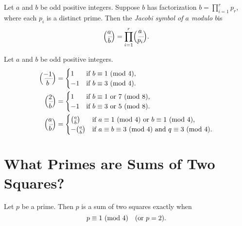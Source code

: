 \documentclass[10pt]{article}
\begin{document}
\begin{definition*}[\textcolor{red}{Jacobi Symbol of $a$ modulo $b$}]
    Let $a$ and $b$ be odd positive integers. Suppose $b$ has factorization $b=\prod_{i=1}^r p_r$, where each $p_i$ is a distinct prime. Then the \textit{Jacobi symbol of $a$ modulo $b$}is
    \[\legendre{a}{b}=\prod_{i=1}^r \legendre{a}{p_i}.\]
\end{definition*}


\begin{theorem}[\textcolor{red}{Generalized Law of Quadratic Reciprocity}]
Let $a$ and $b$ be odd positive integers.
    \begin{align*}
        \legendre{-1}{b}&= 
        \begin{cases}
            1 & \textnormal{if $b\equiv 1 \mod{4}$,} \\
            -1 & \textnormal{if $b \equiv 3 \mod{4}$.}
        \end{cases}
        \\ \legendre{2}{b}&=
        \begin{cases}
            1 & \textnormal{if $b\equiv 1$ or $7 \mod{8}$,} \\
            -1 & \textnormal{if $b \equiv 3$ or $5 \mod{8}$.}
        \end{cases}
        \\ \legendre{a}{b}&=
        \begin{cases}
            \legendre{a}{b} & \textnormal{if $a\equiv 1 \mod{4}$ or $b \equiv 1 \mod{4}$,} \\
            -\legendre{a}{b} & \textnormal{if $a \equiv b \equiv 3 \mod{4}$ and $q \equiv 3\mod{4}$.}
        \end{cases}
    \end{align*}
\end{theorem}

\setcounter{section}{23}
\section{What Primes are Sums of Two Squares?}

\begin{theorem}[\textcolor{red}{Sum of Two Squares Theorem for Primes}]
    Let $p$ be a prime. Then $p$ is a sum of two squares exactly when 
    \[p \equiv 1 \mod{4} \quad (\textnormal{or $p=2$)}.\]
\end{theorem}

\begin{comment}
\begin{statement}If $p$ is a sum of two squares, then $p \equiv 1 \mod{4}$.
\end{statement}


\begin{statement}If $p \equiv 1 \mod{4}$, then $p$ is a sum of two squares.
\end{statement}
\end{comment}
\end{document}
